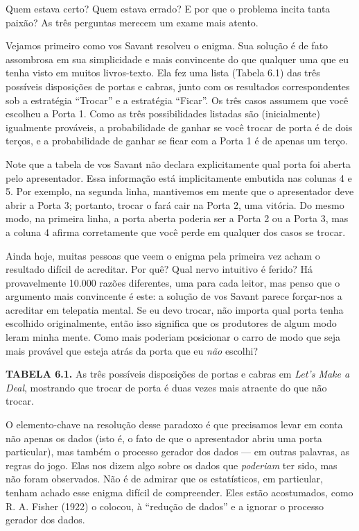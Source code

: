 \documentclass[11pt,a5paper,twoside]{book}
\begin{document}
Quem estava certo? Quem estava errado? E por que o problema incita tanta paixão? As três perguntas merecem um exame mais atento.

Vejamos primeiro como vos Savant resolveu o enigma. Sua solução é de fato assombrosa em sua simplicidade e mais convincente do que qualquer uma que eu tenha visto em muitos livros-texto. Ela fez uma lista (Tabela 6.1) das três possíveis disposições de portas e cabras, junto com os resultados correspondentes sob a estratégia “Trocar” e a estratégia “Ficar”. Os três casos assumem que você escolheu a Porta 1. Como as três possibilidades listadas são (inicialmente) igualmente prováveis, a probabilidade de ganhar se você trocar de porta é de dois terços, e a probabilidade de ganhar se ficar com a Porta 1 é de apenas um terço.

Note que a tabela de vos Savant não declara explicitamente qual porta foi aberta pelo apresentador. Essa informação está implicitamente embutida nas colunas 4 e 5. Por exemplo, na segunda linha, mantivemos em mente que o apresentador deve abrir a Porta 3; portanto, trocar o fará cair na Porta 2, uma vitória. Do mesmo modo, na primeira linha, a porta aberta poderia ser a Porta 2 ou a Porta 3, mas a coluna 4 afirma corretamente que você perde em qualquer dos casos se trocar.

Ainda hoje, muitas pessoas que veem o enigma pela primeira vez acham o resultado difícil de acreditar. Por quê? Qual nervo intuitivo é ferido? Há provavelmente 10.000 razões diferentes, uma para cada leitor, mas penso que o argumento mais convincente é este: a solução de vos Savant parece forçar-nos a acreditar em telepatia mental. Se eu devo trocar, não importa qual porta tenha escolhido originalmente, então isso significa que os produtores de algum modo leram minha mente. Como mais poderiam posicionar o carro de modo que seja mais provável que esteja atrás da porta que eu \textit{não} escolhi?

\textbf{TABELA 6.1.} As três possíveis disposições de portas e cabras em \textit{Let’s Make a Deal}, mostrando que trocar de porta é duas vezes mais atraente do que não trocar.

O elemento-chave na resolução desse paradoxo é que precisamos levar em conta não apenas os dados (isto é, o fato de que o apresentador abriu uma porta particular), mas também o processo gerador dos dados — em outras palavras, as regras do jogo. Elas nos dizem algo sobre os dados que \textit{poderiam} ter sido, mas não foram observados. Não é de admirar que os estatísticos, em particular, tenham achado esse enigma difícil de compreender. Eles estão acostumados, como R. A. Fisher (1922) o colocou, à “redução de dados” e a ignorar o processo gerador dos dados.
\end{document}
